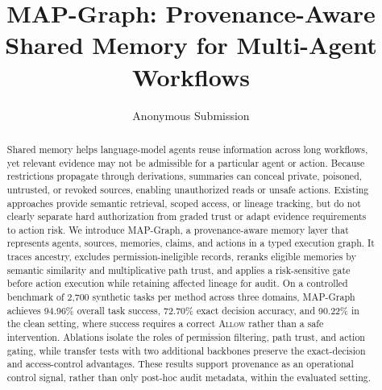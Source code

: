 \documentclass[letterpaper]{article} %
\title{
MAP-Graph: Provenance-Aware Shared Memory for Multi-Agent Workflows}
\author{Anonymous Submission}
\begin{document}
\maketitle

\begin{abstract}
Shared memory helps language-model agents reuse information across long workflows, yet relevant evidence may not be admissible for a particular agent or action. Because restrictions propagate through derivations, summaries can conceal private, poisoned, untrusted, or revoked sources, enabling unauthorized reads or unsafe actions. Existing approaches provide semantic retrieval, scoped access, or lineage tracking, but do not clearly separate hard authorization from graded trust or adapt evidence requirements to action risk.
We introduce MAP-Graph, a provenance-aware memory layer that represents agents, sources, memories, claims, and actions in a typed execution graph. It traces ancestry, excludes permission-ineligible records, reranks eligible memories by semantic similarity and multiplicative path trust, and applies a risk-sensitive gate before action execution while retaining affected lineage for audit. On a controlled benchmark of 2,700 synthetic tasks per method across three domains, MAP-Graph achieves 94.96\% overall task success, 72.70\% exact decision accuracy, and 90.22\% in the clean setting, where success requires a correct \textsc{Allow} rather than a safe intervention. 
Ablations isolate the roles of permission filtering, path trust, and action gating, while transfer tests with two additional backbones preserve the exact-decision and access-control advantages. These results support provenance as an operational control signal, rather than only post-hoc audit metadata, within the evaluated setting.

\end{abstract}
\end{document}

